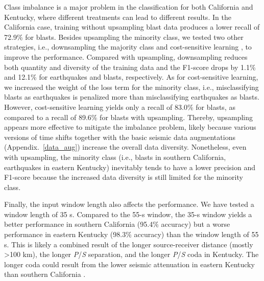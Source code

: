 \documentclass{gji}
\begin{document}
Class imbalance is a major problem in the classification for both California and Kentucky, where different treatments can lead to different results. In the California case, training without upsampling blast data produces a lower recall of 72.9\% for blasts. Besides upsampling the minority class, we tested two other strategies, i.e., downsampling the majority class and cost-sensitive learning \citep{cost_sensitive}, to improve the performance. Compared with upsampling, downsampling reduces both quantity and diversity of the training data and the F1-score drops by 1.1\% and 12.1\% for earthquakes and blasts, respectively. As for cost-sensitive learning, we increased the weight of the loss term for the minority class, i.e., misclassifying blasts as earthquakes is penalized more than misclassifying earthquakes as blasts. However, cost-sensitive learning yields only a recall of 83.0\% for blasts, as compared to a recall of 89.6\% for blasts with upsampling. Thereby, upsampling appears more effective to mitigate the imbalance problem, likely because various versions of time shifts together with the basic seismic data augmentations (Appendix.~\ref{data_aug}) increase the overall data diversity. Nonetheless, even with upsampling, the minority class (i.e., blasts in southern California, earthquakes in eastern Kentucky) inevitably tends to have a lower precision and F1-score because the increased data diversity is still limited for the minority class.

Finally, the input window length also affects the performance. We have tested a window length of 35 s. Compared to the 55-s window, the 35-s window yields a better performance in southern California (95.4\% accuracy) but a worse performance in eastern Kentucky (98.3\% accuracy) than the window length of 55 s. This is likely a combined result of the longer source-receiver distance (mostly \textgreater100 km), the longer \textit{P}\slash \textit{S} separation, and the longer \textit{P}\slash \textit{S} coda in Kentucky. The longer coda could result from the lower seismic attenuation in eastern Kentucky than southern California \citep{attenu_ek,attenu_socal}.
\end{document}
